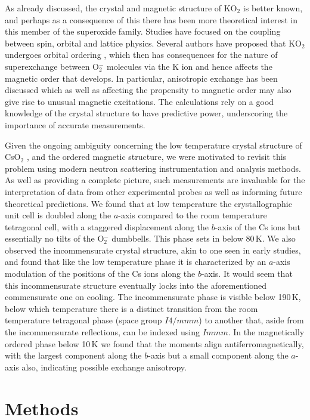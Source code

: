 \documentclass[prb,aps,twocolumn,superscriptaddress,showpacs,footinbib]{revtex4-2}
\newcommand{\cso}{CsO$_{2}$ }
\begin{document}
As already discussed, the crystal and magnetic structure of KO$_{2}$ is better known, and perhaps as a consequence of this there has been more theoretical interest in this member of the superoxide family. Studies have focused on the coupling between spin, orbital and lattice physics. Several authors have proposed that KO$_{2}$ undergoes orbital ordering \cite{Nandy2010,Kim2010,Kim2014}, which then has consequences for the nature of superexchange between O$_{2}^{-}$ molecules via the K ion and hence affects the magnetic order that develops. In particular, anisotropic exchange has been discussed \cite{Solovyev2008} which as well as affecting the propensity to magnetic order may also give rise to unusual magnetic excitations. The calculations rely on a good knowledge of the crystal structure to have predictive power, underscoring the importance of accurate measurements.

Given the ongoing ambiguity concerning the low temperature crystal structure of \cso, and the ordered magnetic structure, we were motivated to revisit this problem using modern neutron scattering instrumentation and analysis methods. As well as providing a complete picture, such measurements are invaluable for the interpretation of data from other experimental probes as well as informing future theoretical predictions. We found that at low temperature the crystallographic unit cell is doubled along the $a$-axis compared to the room temperature tetragonal cell, with a staggered displacement along the $b$-axis of the Cs ions but essentially no tilts of the O$_{2}^{-}$ dumbbells. This phase sets in below 80\,K. We also observed the incommensurate crystal structure, akin to one seen in early studies, and found that like the low temperature phase it is characterized by an $a$-axis modulation of the positions of the Cs ions along the $b$-axis. It would seem that this incommensurate structure eventually locks into the aforementioned commensurate one on cooling. The incommensurate phase is visible below 190\,K, below which temperature there is a distinct transition from the room temperature tetragonal phase (space group $I4/mmm$) to another that, aside from the incommensurate reflections, can be indexed using $Immm$. In the magnetically ordered phase below 10\,K we found that the moments align antiferromagnetically, with the largest component along the $b$-axis but a small component along the $a$-axis also, indicating possible exchange anisotropy.

\section{Methods}\label{sec:methods}
\end{document}

